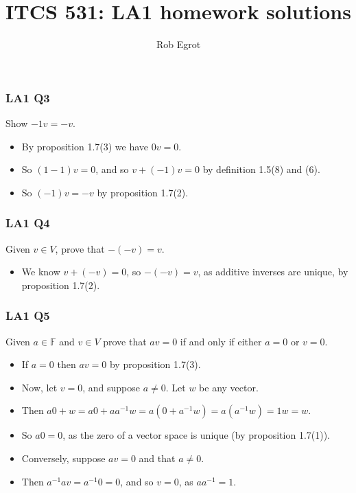 \documentclass[handout]{beamer}
\title{ITCS 531: LA1 homework solutions}
\date{}
\author{Rob Egrot}
\newcommand{\bF}{\mathbb{F}}
\begin{document}
\begin{frame}
\titlepage
\end{frame}

\begin{frame}
\frametitle{LA1 Q3}
Show $-1v = -v$. 
\vspace{1cm}
\begin{itemize}
\item By proposition 1.7(3) we have $0v = 0$. 
\vspace{1cm}
\item So $(1-1)v = 0$, and so $v + (-1)v = 0$ by definition 1.5(8) and (6). 
\vspace{1cm}
\item So $(-1)v = - v$ by proposition 1.7(2).
\end{itemize}
\end{frame}

\begin{frame}
\frametitle{LA1 Q4}
Given $v\in V$, prove that $-(-v)= v$.
\vspace{1cm}
\begin{itemize}
\item We know $v+ (-v) = 0$, so $-(-v) = v$, as additive inverses are unique, by proposition 1.7(2).
\end{itemize}
\end{frame}

\begin{frame}
\frametitle{LA1 Q5}
Given $a\in \bF$ and $v\in V$ prove that $av = 0$ if and only if either $a=0$ or $v=0$.
\vspace{0.5cm}
\begin{itemize}
\item If $a=0$ then $av = 0$ by proposition 1.7(3). 
\vspace{0.3cm}
\item Now, let $v=0$, and suppose $a\neq 0$. Let $w$ be any vector. 
\vspace{0.3cm}
\item Then $a0 + w = a0 + aa^{-1}w = a(0+a^{-1}w) = a(a^{-1}w)= 1w = w$. 
\vspace{0.3cm}
\item So $a0 = 0$, as the zero of a vector space is unique (by proposition 1.7(1)). 
\vspace{0.3cm}
\item Conversely, suppose $av = 0 $ and that $a\neq 0$. 
\vspace{0.3cm}
\item Then $a^{-1}a v = a^{-1} 0 = 0$, and so $v = 0$, as $aa^{-1}=1$.
\end{itemize}
\end{frame}
\end{document}
